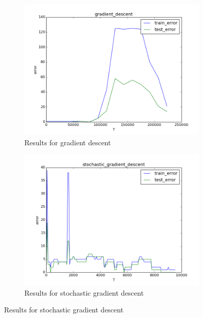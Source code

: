 \documentclass{article}
\begin{document}
\begin{figure}
	\centering
	\begin{subfigure}[b]{0.45\textwidth} 
		\includegraphics[width=\textwidth]{../results/gradient_descent.png}
		\caption{Results for gradient descent}
		\label{fig3}
	\end{subfigure}
	\begin{subfigure}[b]{0.45\textwidth} 
		\includegraphics[width=\textwidth]{../results/stochastic_gradient_descent.png}
		\caption{Results for stochastic gradient descent}
		\label{fig4}
	\end{subfigure}
\end{figure}
\end{document}
